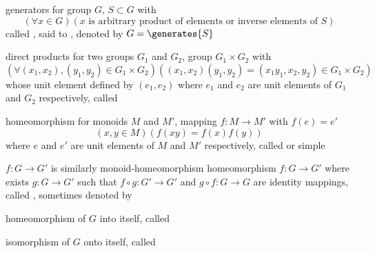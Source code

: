 \documentclass[17pt,landscape]{foils}
\begin{document}
{\begin{mydefinition}{generators}
	for group $G$, $S\subset G$
	with
	$$
		\left(
			\forall x \in G
		\right)
		\left(
			x \mbox{ is arbitrary product of elements or inverse elements of } S
		\right)
	$$
	called ,
	said to ,
	denoted by $G=\generates{S}$%
\end{mydefinition}

\begin{mydefinition}{direct products}
	for two groups $G_1$ and $G_2$,
	group $G_1\times G_2$
	with
	$$
		\left(
			\forall (x_1,x_2), (y_1,y_2) \in G_1 \times G_2
		\right)
		\left(
			(x_1,x_2)(y_1,y_2)
			= (x_1y_1, x_2,y_2) \in G_1 \times G_2
		\right)
	$$
	whose unit element defined by $(e_1,e_2)$
	where $e_1$ and $e_2$ are unit elements of $G_1$ and $G_2$ respectively,
	called %
\end{mydefinition}



\begin{mydefinition}{homeomorphism}
	for monoids $M$ and $M'$,
	mapping $f:M\to M'$ with $f(e)=e'$
	$$
		\left(
			x,y \in M
		\right)
		\left(
			f(xy) = f(x)f(y)
		\right)
	$$
	where $e$ and $e'$ are unit elements of $M$ and $M'$ respectively,
	called  or simple %

	\shrinkspacewithintheoremslike
	\ibit
	\iitem
		 $f:G\to G'$ is similarly monoid-homeomorphism%
	\iitem
		homeomorphism $f:G\to G'$ where exists $g:G\to G'$ such that $f\circ g:G'\to G'$ and $g\circ f:G\to G$
		are identity mappings,
		called ,%
		sometimes denoted by 

	\iitem
		homeomorphism of $G$ into itself, called 

	\iitem
		isomorphism of $G$ onto itself, called 
	\eit
\end{mydefinition}

}
\end{document}
